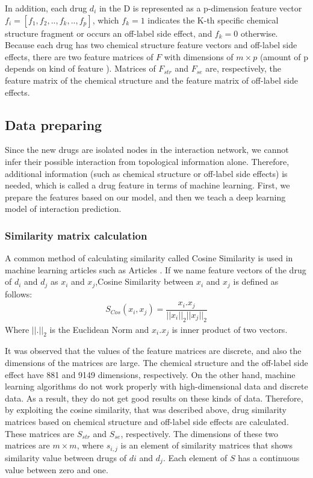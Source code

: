 \documentclass{bmcart}
\begin{document}
In addition, each drug $d_i$ in the D is represented as a p-dimension feature vector $f_i = \left[  f_1, f_2, .., f_k, .., f_p \right]$, which $f_k = 1$ indicates the K-th specific chemical structure fragment or occurs an off-label side effect, and $f_k = 0$ otherwise. Because each drug has two chemical structure feature vectors and off-label side effects, there are two feature matrices of $F$ with dimensions of $m \times p$ (amount of p depends on kind of feature ). Matrices of $F_{str}$ and $F_{se}$ are, respectively, the feature matrix of the chemical structure and the feature matrix of off-label side effects.

\subsection*{Data preparing}
Since the new drugs are isolated nodes in the interaction network, we cannot infer their possible interaction from topological information alone. Therefore, additional information (such as chemical structure or off-label side effects) is needed, which is called a drug feature in terms of machine learning. First, we prepare the features based on our model, and then we teach a deep learning model of interaction prediction.

\subsubsection*{Similarity matrix calculation}

A common method of calculating similarity called Cosine Similarity is used in machine learning articles such as Articles \cite{zhang2016drug, zhang2018manifold}. If we name feature vectors of the drug of $d_i$ and $d_j$
as $x_i$ and $x_j$,Cosine Similarity between $x_i$ and $x_j$ is defined as follows:
\begin{equation}
	\begin{aligned}
		S_{Cos}(x_i,x_j) =\dfrac{x_i . x_j}{||x_i||_2 ||x_j||_2}
	\end{aligned}
\end{equation}
Where $||.||_2$ is the Euclidean Norm and ${x_i . x_j}$ is inner product of two vectors.

It was observed that the values of the feature matrices are discrete, and also the dimensions of the matrices are large. The chemical structure and the off-label side effect have 881 and 9149 dimensions, respectively. On the other hand, machine learning algorithms do not work properly with high-dimensional data and discrete data. As a result, they do not get good results on these kinds of data. Therefore, by exploiting the cosine similarity, that was described above, drug similarity matrices based on chemical structure and off-label side effects are calculated. These matrices are $S_{str}$ and $S_{se}$, respectively. The dimensions of these two matrices are $m \times m$, where $s_{i,j}$ is an element of similarity matrices that shows similarity value between drugs of $di$ and $d_j$. Each element of $S$ has a continuous value between zero and one.
\end{document}
